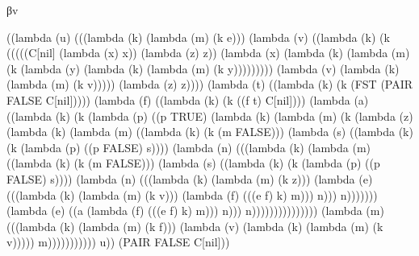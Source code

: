 \documentclass[ms,electronic,twosidetoc,letterpaper,chaptercenter,parttop]{byumsphd}
\begin{document}
\begin{theorem}
βv
\begin{schemedisplay}
((lambda (u) (((lambda (k) (lambda (m) (k e)))
         (lambda (v) ((lambda (k) (k (((((C[nil] (lambda (x) x)) (lambda (z) z))
                            (lambda (x) (lambda (k) (lambda (m) (k (lambda (y) (lambda (k) (lambda (m) (k y)))))))))
                           (lambda (v) (lambda (k) (lambda (m) (k v))))) (lambda (z) z))))
                (lambda (t) ((lambda (k) (k (FST
                                 (PAIR FALSE C[nil]))))
                       (lambda (f) ((lambda (k) (k ((f t) C[nil])))
                              (lambda (a) ((lambda (k) (k (lambda (p) ((p TRUE)
                                                     (lambda (k) (lambda (m) (k (lambda (z) (lambda (k) (lambda (m) ((lambda (k) (k (m FALSE)))
                                                                                       (lambda (s) ((lambda (k) (k (lambda (p) ((p FALSE) s))))
                                                                                              (lambda (n) (((lambda (k) (lambda (m) ((lambda (k) (k (m FALSE)))
                                                                                                                   (lambda (s) ((lambda (k) (k (lambda (p) ((p FALSE) s))))
                                                                                                                          (lambda (n) (((lambda (k) (lambda (m) (k z)))
                                                                                                                                  (lambda (e) (((lambda (k) (lambda (m) (k v)))
                                                                                                                                          (lambda (f) (((e f) k) m))) n))) n)))))))
                                                                                                      (lambda (e) ((a (lambda (f) (((e f) k) m))) n))) n)))))))))))))))
                                     (lambda (m) (((lambda (k) (lambda (m) (k f)))
                                             (lambda (v) (lambda (k) (lambda (m) (k v))))) m))))))))))) u))
 (PAIR FALSE C[nil]))
\end{schemedisplay}


\end{theorem}
\end{document}
